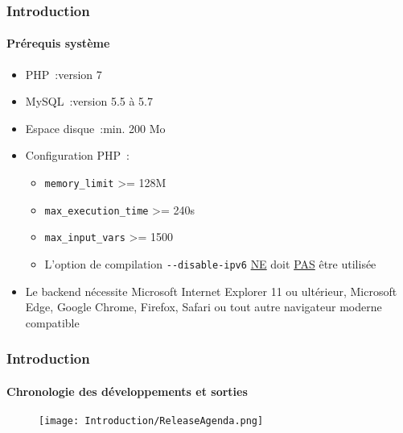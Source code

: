 \begin{frame}[fragile]
	\frametitle{Introduction}
	\framesubtitle{Prérequis système}

	\begin{itemize}
		\item PHP~:\tabto{2.2cm}version 7
		\item MySQL~:\tabto{2.2cm}version 5.5 à 5.7
		\item Espace disque~:\tabto{2.2cm}min. 200 Mo
		\item Configuration PHP~:

			\begin{itemize}
				\item \texttt{memory\_limit} >= 128M
				\item \texttt{max\_execution\_time} >= 240s
				\item \texttt{max\_input\_vars} >= 1500
				\item L'option de compilation \texttt{-}\texttt{-disable-ipv6} \underline{NE} doit \underline{PAS} être utilisée
			\end{itemize}

		\item Le backend nécessite Microsoft Internet Explorer 11 ou ultérieur,
			Microsoft Edge, Google Chrome, Firefox, Safari ou tout autre navigateur
			moderne compatible

	\end{itemize}

\end{frame}

\begin{frame}[fragile]
	\frametitle{Introduction}
	\framesubtitle{Chronologie des développements et sorties}

	\begin{figure}
		\texttt{[image: Introduction/ReleaseAgenda.png]}
	\end{figure}

\end{frame}

